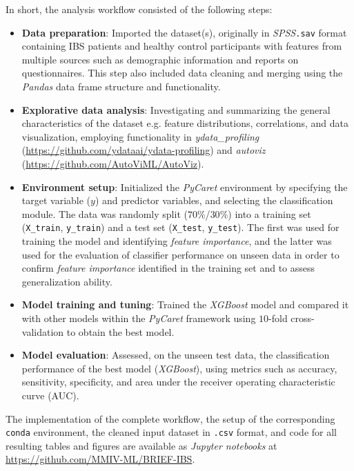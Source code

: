 \documentclass[jcm,article,submit,pdftex,moreauthors]{Definitions/mdpi}
\begin{document}
\noindent In short, the analysis workflow consisted of the following steps:

\begin{itemize}
    \item \textbf{Data preparation}: Imported the dataset(s), originally in \textit{SPSS}\texttt{.sav} format containing IBS patients and healthy control participants with features from multiple sources such as demographic information and reports on questionnaires. This step also included data cleaning and merging using the \textit{Pandas} data frame structure and functionality.
    \item \textbf{Explorative data analysis}: Investigating and summarizing the general characteristics of the dataset e.g. feature distributions, correlations, and data visualization, employing functionality in \textit{ydata\_profiling} ({\small \url{https://github.com/ydataai/ydata-profiling}}) and \textit{autoviz} ({\small \url{https://github.com/AutoViML/AutoViz}}).
    \item \textbf{Environment setup}: Initialized the \textit{PyCaret} environment by specifying the target variable ($y$) and predictor variables, and selecting the classification module. The data was randomly split ($70$\%/$30$\%) into a training set (\texttt{X\_train},  \texttt{y\_train}) and a test set (\texttt{X\_test}, \texttt{y\_test}). The first was used for training the model and identifying \textit{feature importance}, and the latter was used for the evaluation of classifier performance on unseen data in order to confirm \textit{feature importance} identified in the training set and to assess generalization ability.
    \item \textbf{Model training and tuning}: Trained the \textit{XGBoost} model and compared it with other models within the \textit{PyCaret} framework using $10$-fold cross-validation to obtain the best model.
    \item \textbf{Model evaluation}: Assessed, on the unseen test data, the classification performance of the best model (\textit{XGBoost}), using metrics such as accuracy, sensitivity, specificity, and area under the receiver operating characteristic curve (AUC).
\end{itemize}

\noindent The implementation of the complete workflow, the setup of the corresponding \texttt{conda} environment, the cleaned input dataset in \texttt{.csv} format, and code for all resulting tables and figures are available as \textit {Jupyter notebooks} at {\small \url{https://github.com/MMIV-ML/BRIEF-IBS}}.
\end{document}
